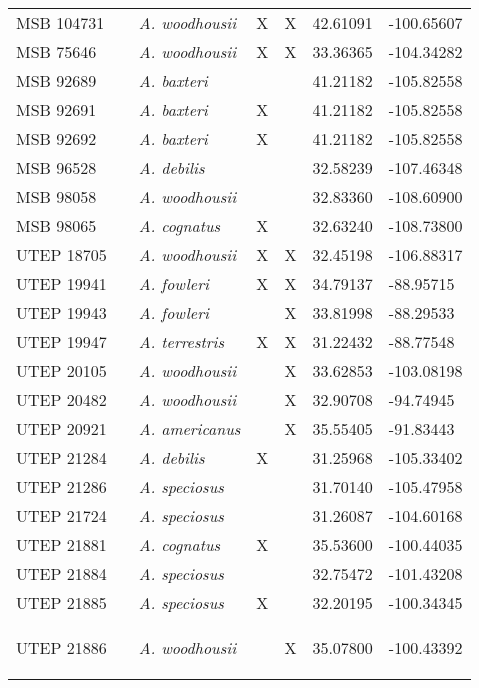 \begin{longtable}{ lllllll }
MSB 104731 &  & \textit{A. woodhousii} & X & X & 42.61091 & -100.65607 \\ 
MSB 75646 &  & \textit{A. woodhousii} & X & X & 33.36365 & -104.34282 \\ 
MSB 92689 &  & \textit{A. baxteri} &  &  & 41.21182 & -105.82558 \\ 
MSB 92691 &  & \textit{A. baxteri} & X &  & 41.21182 & -105.82558 \\ 
MSB 92692 &  & \textit{A. baxteri} & X &  & 41.21182 & -105.82558 \\ 
MSB 96528 &  & \textit{A. debilis} &  &  & 32.58239 & -107.46348 \\ 
MSB 98058 &  & \textit{A. woodhousii} &  &  & 32.83360 & -108.60900 \\ 
MSB 98065 &  & \textit{A. cognatus} & X &  & 32.63240 & -108.73800 \\ 
UTEP 18705 &  & \textit{A. woodhousii} & X & X & 32.45198 & -106.88317 \\ 
UTEP 19941 &  & \textit{A. fowleri} & X & X & 34.79137 & -88.95715 \\ 
UTEP 19943 &  & \textit{A. fowleri} &  & X & 33.81998 & -88.29533 \\ 
UTEP 19947 &  & \textit{A. terrestris} & X & X & 31.22432 & -88.77548 \\ 
UTEP 20105 &  & \textit{A. woodhousii} &  & X & 33.62853 & -103.08198 \\ 
UTEP 20482 &  & \textit{A. woodhousii} &  & X & 32.90708 & -94.74945 \\ 
UTEP 20921 &  & \textit{A. americanus} &  & X & 35.55405 & -91.83443 \\ 
UTEP 21284 &  & \textit{A. debilis} & X &  & 31.25968 & -105.33402 \\ 
UTEP 21286 &  & \textit{A. speciosus} &  &  & 31.70140 & -105.47958 \\ 
UTEP 21724 &  & \textit{A. speciosus} &  &  & 31.26087 & -104.60168 \\ 
UTEP 21881 &  & \textit{A. cognatus} & X &  & 35.53600 & -100.44035 \\ 
UTEP 21884 &  & \textit{A. speciosus} &  &  & 32.75472 & -101.43208 \\ 
UTEP 21885 &  & \textit{A. speciosus} & X &  & 32.20195 & -100.34345 \\ 
UTEP 21886 &  & \textit{A. woodhousii} &  & X & 35.07800 & -100.43392

\label{table:loanedPhylo }
\end{longtable}